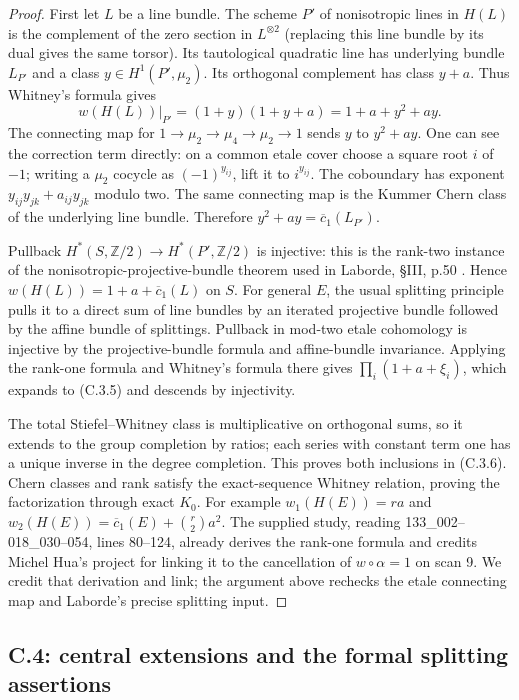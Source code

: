 \begin{proof}
First let $L$ be a line bundle. The scheme $P'$ of nonisotropic lines in
$H(L)$ is the complement of the zero section in $L^{\otimes2}$ (replacing
this line bundle by its dual gives the same torsor). Its tautological
quadratic line has underlying bundle $L_{P'}$ and a class
$y\in H^1(P',\mu_2)$. Its orthogonal complement has class $y+a$.
Thus Whitney's formula gives
\[
 w(H(L))|_{P'}=(1+y)(1+y+a)=1+a+y^2+ay.
\]
The connecting map for $1\to\mu_2\to\mu_4\to\mu_2\to1$ sends
$y$ to $y^2+ay$. One can see the correction term directly: on a common
etale cover choose a square root $i$ of $-1$; writing a $\mu_2$ cocycle
as $(-1)^{y_{ij}}$, lift it to $i^{y_{ij}}$. The coboundary has exponent
$y_{ij}y_{jk}+a_{ij}y_{jk}$ modulo two. The same connecting map is the
Kummer Chern class of the underlying line bundle. Therefore
$y^2+ay=\overline c_1(L_{P'})$.

Pullback $H^*(S,\mathbb Z/2)\to H^*(P',\mathbb Z/2)$ is injective: this
is the rank-two instance of the nonisotropic-projective-bundle theorem
used in Laborde, \S III, p.50 \cite{C-Laborde1976}. Hence
$w(H(L))=1+a+\overline c_1(L)$ on $S$.
For general $E$, the usual splitting principle pulls it to a direct sum of
line bundles by an iterated projective bundle followed by the affine
bundle of splittings. Pullback in mod-two etale cohomology is injective
by the projective-bundle formula and affine-bundle invariance. Applying the
rank-one formula and Whitney's formula there gives
$\prod_i(1+a+\xi_i)$, which expands to (C.3.5) and descends by injectivity.

The total Stiefel--Whitney class is multiplicative on orthogonal sums, so
it extends to the group completion by ratios; each series with constant
term one has a unique inverse in the degree completion. This proves both
inclusions in (C.3.6). Chern classes and rank satisfy the exact-sequence
Whitney relation, proving the factorization through exact $K_0$.
For example $w_1(H(E))=ra$ and
$w_2(H(E))=\overline c_1(E)+\binom r2a^2$.
The supplied study, reading 133\_002--018\_030--054, lines 80--124,
already derives the rank-one formula and credits Michel Hua's project for
linking it to the cancellation of $w\circ\alpha=1$ on scan 9. We credit
that derivation and link; the argument above rechecks the etale connecting
map and Laborde's precise splitting input.
\end{proof}

\subsection{C.4: central extensions and the formal splitting assertions}

